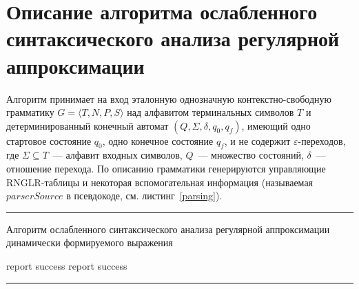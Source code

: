 \clearpage
\section{Описание алгоритма ослабленного синтаксического анализа регулярной аппроксимации}\label{AlgoDescr}

Алгоритм принимает на вход эталонную однозначную контекстно-свободную грамматику $G=\langle T, N, P, S \rangle$ над алфавитом терминальных символов $T$ и детерминированный конечный автомат $(Q,\Sigma,\delta,q_0,q_f)$, имеющий одно стартовое состояние $q_0$, одно конечное состояние $q_f$, и не содержит $\varepsilon$-переходов, где $\Sigma \subseteq T$~--- алфавит входных символов, $Q$~--- множество состояний, $\delta$~--- отношение перехода. По описанию  грамматики генерируются управляющие RNGLR-таблицы и некоторая вспомогательная информация (называемая $parserSource$ в псевдокоде, см. листинг~\ref{parsing}). 

\begin{listing}[!ht]
\hrule

\begin{algorithmic}[1]
\caption{Алгоритм ослабленного синтаксического анализа регулярной аппроксимации динамически формируемого выражения}
\label{parsing}
     {report success}
    \EndIf
  \Else
    \EndWhile
     {report success}
    \EndIf
  \EndIf
\EndFunction
\end{algorithmic}

\hrule
\end{listing}


